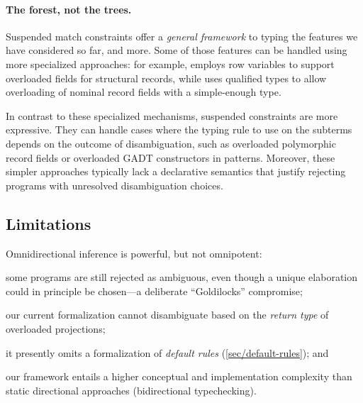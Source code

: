 \documentclass[acmsmall,screen,nonacm%
\Anonymous{,anonymous}{}%
\Final{}{,review}%
]{acmart}
\begin{document}

\paragraph {The forest, not the trees.}

Suspended match constraints offer a \emph{general framework} to typing the
features we have considered so far, and more. Some of those features can be
handled using more specialized approaches: for example, \SML employs row
variables to support overloaded fields for structural records, while \GHC uses
qualified types to allow overloading of nominal record fields with a
simple-enough type.


In contrast to these specialized mechanisms, suspended constraints are more
expressive. They can handle cases where the typing rule to use on the subterms
depends on the outcome of disambiguation, such as overloaded polymorphic record
fields or overloaded GADT constructors in patterns.
%
Moreover, these simpler approaches typically lack a declarative semantics that
justify rejecting programs with unresolved disambiguation choices.

\subsection{Limitations}
\label{sec/overview/limitations}



Omnidirectional inference is powerful, but not omnipotent:
\begin{enumerate*}

  \item some programs are still rejected as ambiguous, even though a unique
    elaboration could in principle be chosen---a deliberate ``Goldilocks''
    compromise;

  \item our current formalization cannot disambiguate based on the \emph{return
    type} of overloaded projections;

  \item it presently omits a formalization of \emph{default rules}
    (\cref{sec/default-rules}); and

  \item our framework entails a higher conceptual and implementation complexity
    than static directional approaches (\eg bidirectional typechecking).

\end{enumerate*}
\end{document}
